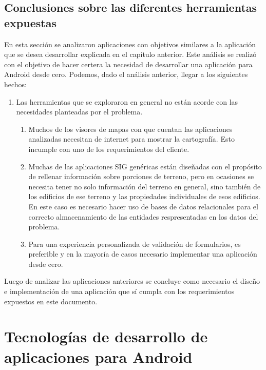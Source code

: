 \subsection{Conclusiones sobre las diferentes herramientas expuestas}
En esta sección se analizaron aplicaciones con objetivos similares a la aplicación que
se desea desarrollar explicada en el capítulo anterior. Este análisis se realizó con el objetivo
de hacer certera la necesidad de desarrollar una aplicación para Android desde cero. Podemos, dado el análisis anterior, llegar a los siguientes hechos:
\begin{enumerate}
    \item Las herramientas que se exploraron en general no están acorde con las necesidades planteadas por el problema.
          \begin{enumerate}
              \item Muchos de los visores de mapas con que cuentan las aplicaciones analizadas necesitan de
                    internet para mostrar la cartografía. Esto incumple con uno de los requerimientos del cliente.
              \item Muchas de las aplicaciones SIG genéricas están diseñadas con el propósito de rellenar información sobre porciones de terreno, pero en ocasiones se necesita tener no solo información del terreno en general, sino también de los edificios de ese terreno y las propiedades individuales de esos edificios. En este caso es necesario hacer uso de bases de datos relacionales para el correcto almacenamiento de las entidades respresentadas en los datos del problema.
              \item Para una experiencia personalizada de validación de formularios, es preferible y en la mayoría de casos necesario implementar una aplicación desde cero.
          \end{enumerate}
\end{enumerate}
Luego de analizar las aplicaciones anteriores se concluye como necesario el diseño e
implementación de una aplicación que sí cumpla con los requerimientos expuestos en este documento.

\section{Tecnologías de desarrollo de aplicaciones para Android}

